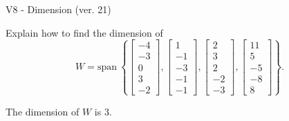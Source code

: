 \begin{exercise}
  \begin{exerciseTitle}V8 - Dimension (ver. 21)\end{exerciseTitle}
  \begin{exerciseStatement}
    Explain how to find the dimension of 
\[W=\mathrm{span}\ \left\{\left[\begin{array}{r}
-4 \\
-3 \\
0 \\
3 \\
-2
\end{array}\right] , \left[\begin{array}{r}
1 \\
-1 \\
-3 \\
-1 \\
-1
\end{array}\right] , \left[\begin{array}{r}
2 \\
3 \\
2 \\
-2 \\
-3
\end{array}\right] , \left[\begin{array}{r}
11 \\
5 \\
-5 \\
-8 \\
8
\end{array}\right]\right\}.\]



  \end{exerciseStatement}
  \begin{exerciseAnswer}
   The dimension of \(W\) is  \(3\).
  


  \end{exerciseAnswer}
\end{exercise}